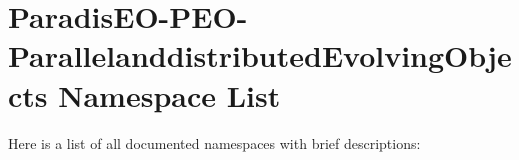 \section{Paradis\-EO-PEO-Parallelanddistributed\-Evolving\-Objects Namespace List}
Here is a list of all documented namespaces with brief descriptions:\begin{CompactList}
\item{}
\end{CompactList}

